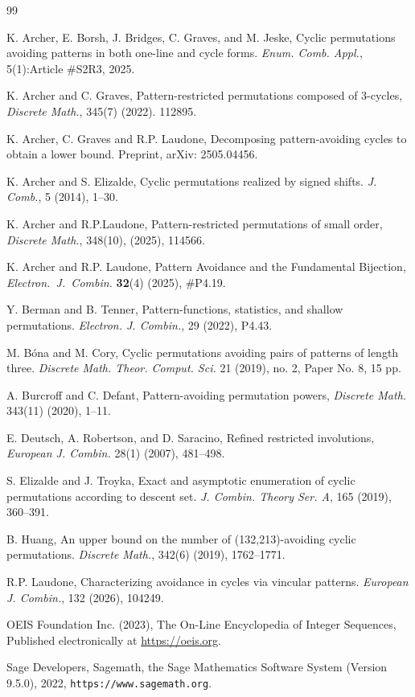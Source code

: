 \documentclass[11pt]{article}
\theoremstyle{definition}
\begin{document}

\begin{thebibliography}{99}

      K. Archer, E. Borsh, J. Bridges, C. Graves, and M. Jeske, Cyclic permutations avoiding patterns in both one-line and cycle forms. \textit{Enum. Comb. Appl.}, 5(1):Article \#S2R3, 2025.

      K. Archer and C. Graves, Pattern-restricted permutations composed of 3-cycles, \textit{Discrete Math.}, 345(7) (2022). 112895.

     K. Archer, C. Graves and R.P. Laudone, Decomposing pattern-avoiding cycles to obtain a lower bound. Preprint, arXiv: 2505.04456.
    
     K. Archer and S. Elizalde, Cyclic permutations realized by signed shifts. \textit{J. Comb.}, 5 (2014), 1--30.

     K. Archer and R.P.Laudone, Pattern-restricted permutations of small order, \textit{Discrete Math.}, 348(10), (2025), 114566.

     K. Archer and R.P. Laudone, Pattern Avoidance and the Fundamental Bijection, \emph{Electron.\ J.\ Combin.} \textbf{32}(4) (2025), \#P4.19.

     Y. Berman and B. Tenner, Pattern-functions, statistics, and shallow permutations. \textit{Electron. J. Combin.}, 29 (2022), P4.43.
    
      M. B\'{o}na and M. Cory, Cyclic permutations avoiding pairs of patterns of length three. \textit{Discrete Math. Theor. Comput. Sci.} 21 (2019), no. 2, Paper No. 8, 15 pp.

     A. Burcroff and C. Defant, Pattern-avoiding permutation powers, \textit{Discrete Math.}  343(11) (2020), 1--11.%

     E. Deutsch, A. Robertson, and D. Saracino, Refined restricted involutions, \textit{European J. Combin.} 28(1) (2007), 481--498. 
    
     S. Elizalde and J. Troyka, Exact and asymptotic enumeration of cyclic permutations according to descent set. \textit{J. Combin. Theory Ser. A}, 165 (2019), 360--391.
    
     B. Huang, An upper bound on the number of (132,213)-avoiding cyclic permutations. \textit{Discrete Math.}, 342(6) (2019), 1762--1771.

     R.P. Laudone, Characterizing avoidance in cycles via vincular patterns. \textit{European J. Combin.}, 132 (2026), 104249.
    
     OEIS Foundation Inc. (2023), The On-Line Encyclopedia of Integer Sequences, Published electronically at \url{https://oeis.org}.
    
    
     Sage Developers, Sagemath, the Sage Mathematics Software System (Version 9.5.0), 2022, \texttt{https://www.sagemath.org}.
    
\end{thebibliography}

\end{document}
